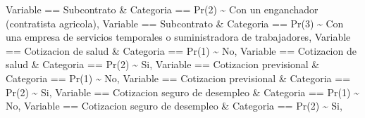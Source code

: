 \documentclass[
]{article}
\newenvironment{Shaded}{\begin{snugshade}}{\end{snugshade}}
\newcommand{\NormalTok}[1]{#1}
\newcommand{\SpecialCharTok}[1]{\textcolor[rgb]{0.00,0.00,0.00}{#1}}
\newcommand{\StringTok}[1]{\textcolor[rgb]{0.31,0.60,0.02}{#1}}
\begin{document}
\begin{Shaded}
\begin{Highlighting}[]
\NormalTok{         Variable }\SpecialCharTok{==} \StringTok{\textquotesingle{}Subcontrato\textquotesingle{}} \SpecialCharTok{\&}\NormalTok{ Categoria }\SpecialCharTok{==} \StringTok{\textquotesingle{}Pr(2)\textquotesingle{}} \SpecialCharTok{\textasciitilde{}} \StringTok{\textquotesingle{}Con un enganchador (contratista agricola)\textquotesingle{}}\NormalTok{,}
\NormalTok{         Variable }\SpecialCharTok{==} \StringTok{\textquotesingle{}Subcontrato\textquotesingle{}} \SpecialCharTok{\&}\NormalTok{ Categoria }\SpecialCharTok{==} \StringTok{\textquotesingle{}Pr(3)\textquotesingle{}} \SpecialCharTok{\textasciitilde{}} \StringTok{\textquotesingle{}Con una empresa de servicios temporales o suministradora de trabajadores\textquotesingle{}}\NormalTok{, }
\NormalTok{         Variable }\SpecialCharTok{==} \StringTok{\textquotesingle{}Cotizacion de salud\textquotesingle{}} \SpecialCharTok{\&}\NormalTok{ Categoria }\SpecialCharTok{==} \StringTok{\textquotesingle{}Pr(1)\textquotesingle{}} \SpecialCharTok{\textasciitilde{}} \StringTok{\textquotesingle{}No\textquotesingle{}}\NormalTok{, }
\NormalTok{         Variable }\SpecialCharTok{==} \StringTok{\textquotesingle{}Cotizacion de salud\textquotesingle{}} \SpecialCharTok{\&}\NormalTok{ Categoria }\SpecialCharTok{==} \StringTok{\textquotesingle{}Pr(2)\textquotesingle{}} \SpecialCharTok{\textasciitilde{}} \StringTok{\textquotesingle{}Si\textquotesingle{}}\NormalTok{,}
\NormalTok{         Variable }\SpecialCharTok{==} \StringTok{\textquotesingle{}Cotizacion previsional\textquotesingle{}} \SpecialCharTok{\&}\NormalTok{ Categoria }\SpecialCharTok{==} \StringTok{\textquotesingle{}Pr(1)\textquotesingle{}} \SpecialCharTok{\textasciitilde{}} \StringTok{\textquotesingle{}No\textquotesingle{}}\NormalTok{,}
\NormalTok{         Variable }\SpecialCharTok{==} \StringTok{\textquotesingle{}Cotizacion previsional\textquotesingle{}} \SpecialCharTok{\&}\NormalTok{ Categoria }\SpecialCharTok{==} \StringTok{\textquotesingle{}Pr(2)\textquotesingle{}} \SpecialCharTok{\textasciitilde{}} \StringTok{\textquotesingle{}Si\textquotesingle{}}\NormalTok{,}
\NormalTok{         Variable }\SpecialCharTok{==} \StringTok{\textquotesingle{}Cotizacion seguro de desempleo\textquotesingle{}} \SpecialCharTok{\&}\NormalTok{ Categoria }\SpecialCharTok{==} \StringTok{\textquotesingle{}Pr(1)\textquotesingle{}} \SpecialCharTok{\textasciitilde{}} \StringTok{\textquotesingle{}No\textquotesingle{}}\NormalTok{,}
\NormalTok{         Variable }\SpecialCharTok{==} \StringTok{\textquotesingle{}Cotizacion seguro de desempleo\textquotesingle{}} \SpecialCharTok{\&}\NormalTok{ Categoria }\SpecialCharTok{==} \StringTok{\textquotesingle{}Pr(2)\textquotesingle{}} \SpecialCharTok{\textasciitilde{}} \StringTok{\textquotesingle{}Si\textquotesingle{}}\NormalTok{,}

\end{Highlighting}
\end{Shaded}
\end{document}
